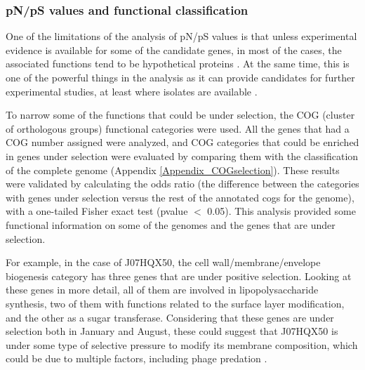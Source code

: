 \subsubsection{pN/pS values and functional classification}

One of the limitations of the analysis of pN/pS values is that unless experimental evidence is available for some of the candidate genes, in most of the cases, the associated functions tend to be hypothetical proteins \cite{Tai:2011jo}. At the same time, this is one of the powerful things in the analysis as it can provide candidates for further experimental studies, at least where isolates are available \cite{Fricke:2011gy}.

To narrow some of the functions that could be under selection, the COG (cluster of orthologous groups) functional categories were used. All the genes that had a COG number assigned were analyzed, and COG categories that could be enriched in genes under selection were evaluated by comparing them with the classification of the complete genome (Appendix \ref{Appendix_COGselection}). These results were validated by calculating the odds ratio (the difference between the categories with genes under selection versus the rest of the annotated cogs for the genome), with a one-tailed Fisher exact test (pvalue $<$ 0.05). This analysis provided some functional information on some of the genomes and the genes that are under selection. 

For example, in the case of J07HQX50, the cell wall/membrane/envelope biogenesis category has three genes that are under positive selection. Looking at these genes in more detail, all of them are involved in lipopolysaccharide synthesis, two of them with functions related to the surface layer modification, and the other as a sugar transferase. Considering that these genes are under selection both in January and August, these could suggest that J07HQX50 is under some type of selective pressure to modify its membrane composition, which could be due to multiple factors, including phage predation \cite{RodriguezValera:2009cr}.

